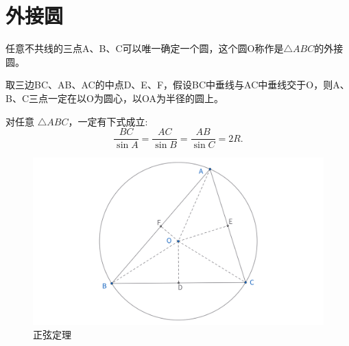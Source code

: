 \newpage 
\section{外接圆}
\begin{definition}
任意不共线的三点A、B、C可以唯一确定一个圆，这个圆O称作是$\triangle ABC$的外接圆。

取三边BC、AB、AC的中点D、E、F，假设BC中垂线与AC中垂线交于O，则A、B、C三点一定在以O为圆心，以OA为半径的圆上。    
\end{definition}

\begin{theorem}
    对任意 $\triangle ABC$，一定有下式成立:
    $$\frac{BC}{\sin A} = \frac{AC}{\sin B} = \frac{AB}{\sin C}=2R.$$
\end{theorem}
\begin{figure}[H]
    \centering
    \includegraphics[width=\linewidth]{figures/正弦定理.png}
    \caption{正弦定理}
\end{figure}

\newpage 
